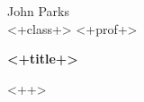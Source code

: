 \documentclass[11pt, letterpaper, notitlepage]{article}
\begin{document}
\noindent
John Parks\\
<+class+>
<+prof+>

\begin{center}
{\Large \textbf{<+title+>}} 
\end{center}

<++>



\end{document}
